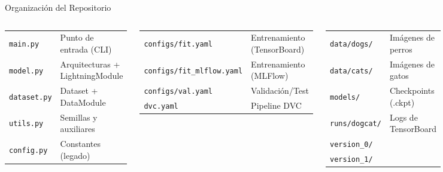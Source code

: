 \documentclass[aspectratio=169,10pt]{beamer}
\newcommand{\codefile}[1]{\texttt{\textcolor{pyblue}{#1}}}
\begin{document}
\begin{frame}{Organización del Repositorio}
    \begin{columns}
        \begin{tcolorbox}[colback=lightgray, colframe=pyblue!60, title=Archivos principales]
        \scriptsize
        \begin{tabular}{ll}
            \codefile{main.py}     & Punto de entrada (CLI)    \\
            \codefile{model.py}    & Arquitecturas + LightningModule \\
            \codefile{dataset.py}  & Dataset + DataModule      \\
            \codefile{utils.py}    & Semillas y auxiliares     \\
            \codefile{config.py}   & Constantes (legado)       \\
        \end{tabular}
        \end{tcolorbox}

        \vspace{4pt}
        \begin{tcolorbox}[colback=lightgray, colframe=pyorange!80, title=Configuración]
        \scriptsize
        \begin{tabular}{ll}
            \codefile{configs/fit.yaml}        & Entrenamiento (TensorBoard) \\
            \codefile{configs/fit\_mlflow.yaml} & Entrenamiento (MLFlow)      \\
            \codefile{configs/val.yaml}        & Validación/Test              \\
            \codefile{dvc.yaml}                & Pipeline DVC                \\
        \end{tabular}
        \end{tcolorbox}

        \begin{tcolorbox}[colback=lightgray, colframe=codegreen!80, title=Datos y artefactos]
        \scriptsize
        \begin{tabular}{ll}
            \codefile{data/dogs/}  & Imágenes de perros      \\
            \codefile{data/cats/}  & Imágenes de gatos       \\
            \codefile{models/}     & Checkpoints (.ckpt)     \\
            \codefile{runs/dogcat/} & Logs de TensorBoard    \\
            \quad\codefile{version\_0/} &                    \\
            \quad\codefile{version\_1/} &                    \\
        \end{tabular}
        \end{tcolorbox}
    \end{columns}


\end{frame}
\end{document}
